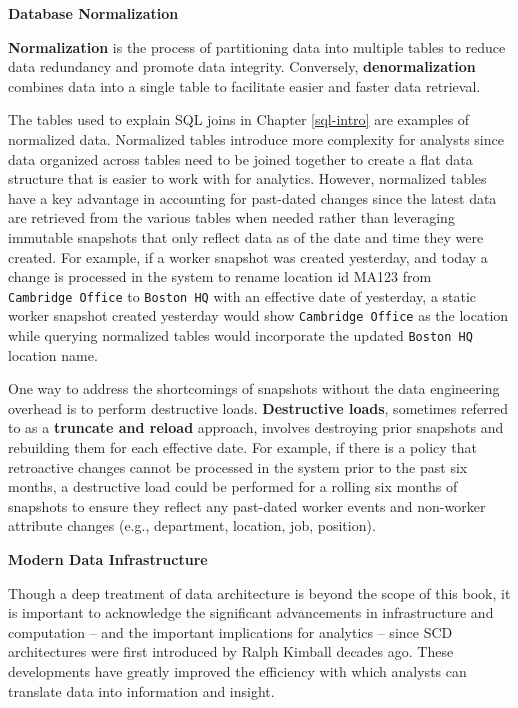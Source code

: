 \documentclass[
]{book}
\begin{document}
\textbf{Database Normalization}

\textbf{Normalization} is the process of partitioning data into multiple tables to reduce data redundancy and promote data integrity. Conversely, \textbf{denormalization} combines data into a single table to facilitate easier and faster data retrieval.

The tables used to explain SQL joins in Chapter \ref{sql-intro} are examples of normalized data. Normalized tables introduce more complexity for analysts since data organized across tables need to be joined together to create a flat data structure that is easier to work with for analytics. However, normalized tables have a key advantage in accounting for past-dated changes since the latest data are retrieved from the various tables when needed rather than leveraging immutable snapshots that only reflect data as of the date and time they were created. For example, if a worker snapshot was created yesterday, and today a change is processed in the system to rename location id MA123 from \texttt{Cambridge\ Office} to \texttt{Boston\ HQ} with an effective date of yesterday, a static worker snapshot created yesterday would show \texttt{Cambridge\ Office} as the location while querying normalized tables would incorporate the updated \texttt{Boston\ HQ} location name.

One way to address the shortcomings of snapshots without the data engineering overhead is to perform destructive loads. \textbf{Destructive loads}, sometimes referred to as a \textbf{truncate and reload} approach, involves destroying prior snapshots and rebuilding them for each effective date. For example, if there is a policy that retroactive changes cannot be processed in the system prior to the past six months, a destructive load could be performed for a rolling six months of snapshots to ensure they reflect any past-dated worker events and non-worker attribute changes (e.g., department, location, job, position).

\textbf{Modern Data Infrastructure}

Though a deep treatment of data architecture is beyond the scope of this book, it is important to acknowledge the significant advancements in infrastructure and computation -- and the important implications for analytics -- since SCD architectures were first introduced by Ralph Kimball decades ago. These developments have greatly improved the efficiency with which analysts can translate data into information and insight.
\end{document}

